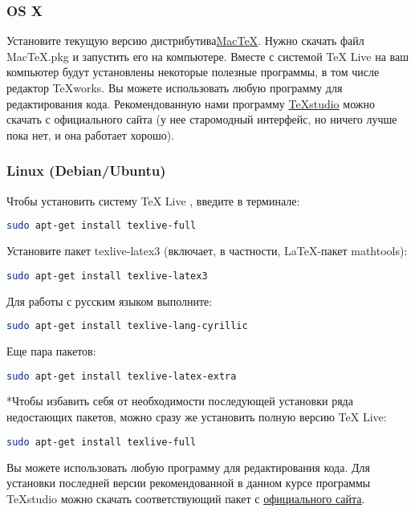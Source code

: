 \subsubsection{OS X}
Установите текущую версию дистрибутива\href{https://tug.org/mactex/}{MacTeX}. 
Нужно скачать файл MacTeX.pkg и запустить его на компьютере. 
Вместе с системой TeX Live на ваш компьютер будут установлены некоторые полезные программы, в том числе редактор TeXworks. 
Вы можете использовать любую программу для редактирования кода. 
Рекомендованную нами программу \href{https://www.texstudio.org}{TeXstudio} можно скачать с официального сайта (у нее старомодный интерфейс, но ничего лучше пока нет, и она работает хорошо).

\subsubsection{Linux (Debian/Ubuntu)}

Чтобы установить систему TeX Live , введите в терминале:
\begin{lstlisting}[backgroundcolor = \color{light-gray}, language=bash]
sudo apt-get install texlive-full
\end{lstlisting}

Установите пакет texlive-latex3 (включает, в частности, LaTeX-пакет mathtools):
\begin{lstlisting}[backgroundcolor = \color{light-gray}, language=bash]
sudo apt-get install texlive-latex3
\end{lstlisting}


Для работы с русским языком выполните:
\begin{lstlisting}[backgroundcolor = \color{light-gray}, language=bash]
sudo apt-get install texlive-lang-cyrillic
\end{lstlisting} 


Еще пара пакетов:
\begin{lstlisting}[backgroundcolor = \color{light-gray}, language=bash]
sudo apt-get install texlive-latex-extra
\end{lstlisting}

*Чтобы избавить себя от необходимости последующей установки ряда недостающих пакетов, можно сразу же установить полную версию TeX Live:
\begin{lstlisting}[backgroundcolor = \color{light-gray}, language=bash]
sudo apt-get install texlive-full
\end{lstlisting}

Вы можете использовать любую программу для редактирования кода. Для установки последней версии рекомендованной в данном курсе программы TeXstudio можно скачать соответствующий пакет с \href{http://texstudio.sourceforge.net/#download}{официального сайта}.

